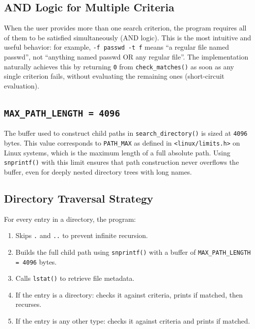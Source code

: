 \documentclass[12pt, a4paper]{article}
\begin{document}
\subsection{AND Logic for Multiple Criteria}

When the user provides more than one search criterion, the program requires all of them
to be satisfied simultaneously (AND logic). This is the most intuitive and useful behavior:
for example, \texttt{-f passwd -t f} means ``a regular file named passwd'', not ``anything
named passwd OR any regular file''. The implementation naturally achieves this by returning
\texttt{0} from \texttt{check\_matches()} as soon as any single criterion fails, without
evaluating the remaining ones (short-circuit evaluation).

\subsection{\texttt{MAX\_PATH\_LENGTH = 4096}}

The buffer used to construct child paths in \texttt{search\_directory()} is sized at
\texttt{4096} bytes. This value corresponds to \texttt{PATH\_MAX} as defined in
\texttt{<linux/limits.h>} on Linux systems, which is the maximum length of a full
absolute path. Using \texttt{snprintf()} with this limit ensures that path construction
never overflows the buffer, even for deeply nested directory trees with long names.

\subsection{Directory Traversal Strategy}

For every entry in a directory, the program:
\begin{enumerate}[noitemsep]
    \item Skips \texttt{.} and \texttt{..} to prevent infinite recursion.
    \item Builds the full child path using \texttt{snprintf()} with a buffer of \texttt{MAX\_PATH\_LENGTH = 4096} bytes.
    \item Calls \texttt{lstat()} to retrieve file metadata.
    \item If the entry is a directory: checks it against criteria, prints if matched, then recurses.
    \item If the entry is any other type: checks it against criteria and prints if matched.
\end{enumerate}
\end{document}
